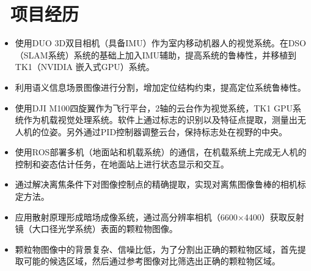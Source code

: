 \documentclass{resume}
\begin{document}
\section{\faUsers\ 项目经历}
\begin{itemize}\small
  \item 使用DUO 3D双目相机（具备IMU）作为室内移动机器人的视觉系统。在DSO（SLAM系统）系统的基础上加入IMU辅助，提高系统的鲁棒性，并移植到TK1（NVIDIA 嵌入式GPU）系统。
  \item 利用语义信息场景图像进行分割，增加定位结构约束，提高定位系统鲁棒性。

\end{itemize}

\begin{itemize}\small
  \item 使用DJI M100四旋翼作为飞行平台，2轴的云台作为视觉系统，TK1 GPU系统作为机载视觉处理系统。软件上通过标志的识别以及特征点提取，测量出无人机的位姿。另外通过PID控制器调整云台，保持标志处在视野的中央。
  \item 使用ROS部署多机（地面站和机载系统）的通信，在机载系统上完成无人机的控制和姿态估计任务，在地面站上进行状态显示和交互。
  \item 通过解决离焦条件下对图像控制点的精确提取，实现对离焦图像鲁棒的相机标定方法。
\end{itemize}

\begin{itemize}\small
\item 应用散射原理形成暗场成像系统，通过高分辨率相机（6600$\times$4400）获取反射镜（大口径光学系统）表面的颗粒物图像。
\item 颗粒物图像中的背景复杂、信噪比低，为了分割出正确的颗粒物区域，首先提取可能的候选区域，然后通过参考图像对比筛选出正确的颗粒物区域。
\end{itemize}
\end{document}
